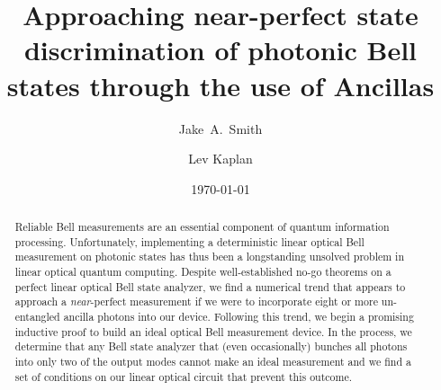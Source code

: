 \documentclass[aps,pra,twocolumn,showpacs,superscriptaddress,floatfix,10pt]{revtex4}
\begin{document}
\newcommand{\beq}{\begin{equation}}
\newcommand{\eeq}{\end{equation}}
\newcommand{\ben}{\begin{eqnarray}}
\newcommand{\een}{\end{eqnarray}}
\newcommand{\bea}{\begin{array}}
\newcommand{\eea}{\end{array}}
\newcommand{\om}{(\omega )}
\newcommand{\bef}{\begin{figure}}
\newcommand{\eef}{\end{figure}}
\newcommand{\leg}[1]{\caption{\protect\rm{\protect\footnotesize{#1}}}}
\newcommand{\ew}[1]{\langle{#1}\rangle}
\newcommand{\be}[1]{\mid\!{#1}\!\mid}
\newcommand{\no}{\nonumber}
\newcommand{\etal}{{\em et~al }}
\newcommand{\geff}{g_{\mbox{\it{\scriptsize{eff}}}}}
\newcommand{\da}[1]{{#1}^\dagger}
\newcommand{\cf}{{\it cf.\/}\ }
\newcommand{\ie}{{\it i.e.\/}\ }   

\newcommand{\spazio}{\vspace{0.3cm}}%
\newcommand{\de}[1]{\frac{\partial}{\partial{#1}}}
\newcommand{\U}{\tilde{U}}
\newcommand{\V}{\tilde{V}}


\title{Approaching near-perfect state discrimination of photonic Bell states through the use of Ancillas}

\author{Jake~A.~Smith}

\author{Lev Kaplan}

 \begin{abstract}
 	Reliable Bell measurements are an essential component of quantum information processing. Unfortunately, implementing a deterministic linear optical Bell measurement on photonic states has thus been a longstanding unsolved problem in linear optical quantum computing. Despite well-established no-go theorems on a perfect linear optical Bell state analyzer, we find a numerical trend that appears to approach a \textit{near}-perfect measurement if we were to incorporate eight or more un-entangled ancilla photons into our device. Following this trend, we begin a promising inductive proof to build an ideal optical Bell measurement device. In the process, we determine that any Bell state analyzer that (even occasionally) bunches all photons into only two of the output modes cannot make an ideal measurement and we find a set of conditions on our linear optical circuit that prevent this outcome.
\end{abstract}                                                               
\date{\today}
\maketitle
\end{document}
